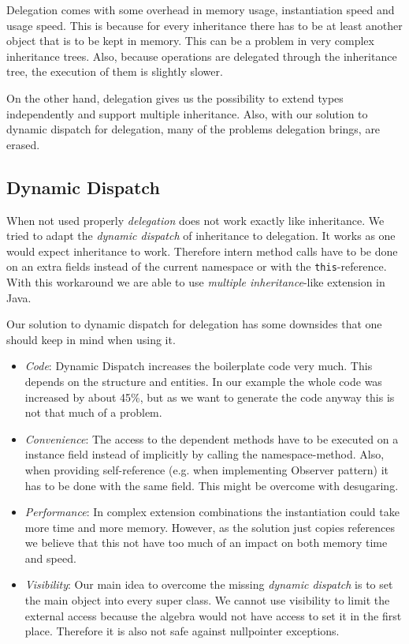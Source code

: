 \documentclass{report}
\begin{document}
Delegation comes with some overhead in memory usage, instantiation speed and usage speed. This is because for every inheritance there has to be at least another object that is to be kept in memory. This can be a problem in very complex inheritance trees. Also, because operations are delegated through the inheritance tree, the execution of them is slightly slower.

On the other hand, delegation gives us the possibility to extend types independently and support multiple inheritance. Also, with our solution to dynamic dispatch for delegation, many of the problems delegation brings, are erased.

\subsection{Dynamic Dispatch}
\label{discussionDynamicDispatch}

When not used properly \emph{delegation} does not work exactly like inheritance. We tried to adapt the \emph{dynamic dispatch} of inheritance to delegation. It works as one would expect inheritance to work. Therefore intern method calls have to be done on an extra fields instead of the current namespace or with the \lstinline{this}-reference. With this workaround we are able to use \emph{multiple inheritance}-like extension in Java.

Our solution to dynamic dispatch for delegation has some downsides that one should keep in mind when using it.
\begin{itemize}
  \item \emph{Code}: Dynamic Dispatch increases the boilerplate code very much. This depends on the structure and entities. In our example the whole code was increased by about 45\%, but as we want to generate the code anyway this is not that much of a problem.
  \item \emph{Convenience}: The access to the dependent methods have to be executed on a instance field instead of implicitly by calling the namespace-method. Also, when providing self-reference (e.g. when implementing Observer pattern\cite{Gof-Design-1993}) it has to be done with the same field. This might be overcome with desugaring.
  \item \emph{Performance}: In complex extension combinations the instantiation could take more time and more memory. However, as the solution just copies references we believe that this not have too much of an impact on both memory time and speed.
  \item \emph{Visibility}: Our main idea to overcome the missing \emph{dynamic dispatch} is to set the main object into every super class. We cannot use visibility to limit the external access because the algebra would not have access to set it in the first place. Therefore it is also not safe against nullpointer exceptions.
\end{itemize}
\end{document}
